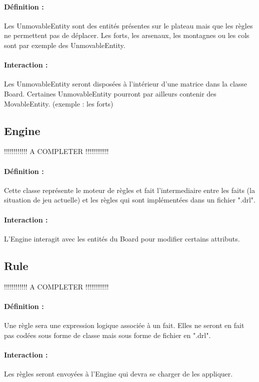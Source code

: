			\paragraph{Définition :}
			Les UnmovableEntity sont des entités présentes sur le plateau mais que les règles ne permettent pas de déplacer. 
			Les forts, les arsenaux, les montagnes ou les cols sont par exemple des UnmovableEntity.
			\paragraph{Interaction :}
			Les UnmovableEntity seront disposées à l'intérieur d'une matrice dans la classe Board. 
			Certaines UnmovableEntity pourront par ailleurs contenir des MovableEntity. (exemple : les forts)

		\subsection*{Engine}

			!!!!!!!!!!!! A COMPLETER !!!!!!!!!!!!
			\paragraph{Définition :}
			Cette classe représente le moteur de règles et fait l'intermediaire entre les faits (la situation de jeu actuelle) 
			et les règles qui sont implémentées dans un fichier ".drl".
			\paragraph{Interaction :}
			L'Engine interagit avec les entités du Board pour modifier certains attributs.

		\subsection*{Rule}

			!!!!!!!!!!!! A COMPLETER !!!!!!!!!!!!
			\paragraph{Définition :}
			Une règle sera une expression logique associée à un fait. Elles ne seront en fait pas codées sous forme de classe mais 
			sous forme de fichier en ".drl".
			\paragraph{Interaction :}
			Les règles seront envoyées à l'Engine qui devra se charger de les appliquer.


